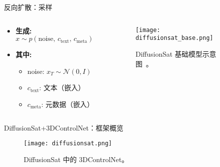 \begin{refsection}
  \begin{frame}{反向扩散：采样}
    \begin{columns}[t]
      \begin{column}{0.4\textwidth}
        \small
        \begin{itemize}
          \item \textbf{生成:} \(x \sim p(\text{noise},\,c_{\text{text}},\,c_{\text{meta}})\)
          \item \textbf{其中:}
          \begin{itemize}
            \item noise: \(x_T\!\sim\!\mathcal{N}(0,I)\)
            \item \(c_{\text{text}}\): 文本（嵌入）
            \item \(c_{\text{meta}}\): 元数据（嵌入）
          \end{itemize}
        \end{itemize}
      \end{column}
      \begin{column}{0.6\textwidth}
        \begin{figure}
          \centering
          \texttt{[image: diffusionsat\_base.png]}
          \caption{\scriptsize DiffusionSat 基础模型示意图~\parencite{diffusionset2024}。}
        \end{figure}
      \end{column}
    \end{columns}
    \bottomleftrefs
  \end{frame}
\end{refsection}
  

\begin{refsection}
  \begin{frame}{DiffusionSat+3DControlNet：框架概览}
    \begin{figure}
      \centering
      \texttt{[image: diffusionsat.png]}
      \caption[]{\scriptsize DiffusionSat 中的 3DControlNet。~\parencite{diffusionset2024}}
    \end{figure}
    \bottomleftrefs
  \end{frame}
\end{refsection}

